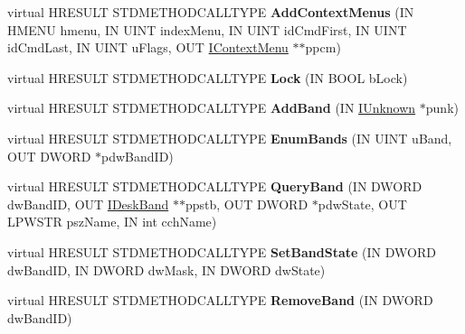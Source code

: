 \begin{DoxyCompactItemize}
\item 
\mbox{\label{class_c_tray_band_site_a7f420a73eb2031a704a1859064c8f207}} 
virtual H\+R\+E\+S\+U\+LT S\+T\+D\+M\+E\+T\+H\+O\+D\+C\+A\+L\+L\+T\+Y\+PE {\bfseries Add\+Context\+Menus} (IN H\+M\+E\+NU hmenu, IN U\+I\+NT index\+Menu, IN U\+I\+NT id\+Cmd\+First, IN U\+I\+NT id\+Cmd\+Last, IN U\+I\+NT u\+Flags, O\+UT \hyperlink{interface_i_context_menu}{I\+Context\+Menu} $\ast$$\ast$ppcm)
\item 
\mbox{\label{class_c_tray_band_site_abe04b4ec21254cceabe23005e13d9721}} 
virtual H\+R\+E\+S\+U\+LT S\+T\+D\+M\+E\+T\+H\+O\+D\+C\+A\+L\+L\+T\+Y\+PE {\bfseries Lock} (IN B\+O\+OL b\+Lock)
\item 
\mbox{\label{class_c_tray_band_site_aa7c040977ce02008a9393a336c75d371}} 
virtual H\+R\+E\+S\+U\+LT S\+T\+D\+M\+E\+T\+H\+O\+D\+C\+A\+L\+L\+T\+Y\+PE {\bfseries Add\+Band} (IN \hyperlink{interface_i_unknown}{I\+Unknown} $\ast$punk)
\item 
\mbox{\label{class_c_tray_band_site_a58b620ab69d9e54791b832413130e144}} 
virtual H\+R\+E\+S\+U\+LT S\+T\+D\+M\+E\+T\+H\+O\+D\+C\+A\+L\+L\+T\+Y\+PE {\bfseries Enum\+Bands} (IN U\+I\+NT u\+Band, O\+UT D\+W\+O\+RD $\ast$pdw\+Band\+ID)
\item 
\mbox{\label{class_c_tray_band_site_a602321533fd4bfede33e4b92eabce6a7}} 
virtual H\+R\+E\+S\+U\+LT S\+T\+D\+M\+E\+T\+H\+O\+D\+C\+A\+L\+L\+T\+Y\+PE {\bfseries Query\+Band} (IN D\+W\+O\+RD dw\+Band\+ID, O\+UT \hyperlink{interface_i_desk_band}{I\+Desk\+Band} $\ast$$\ast$ppstb, O\+UT D\+W\+O\+RD $\ast$pdw\+State, O\+UT L\+P\+W\+S\+TR psz\+Name, IN int cch\+Name)
\item 
\mbox{\label{class_c_tray_band_site_a691afaf066ef4e9b482df62d62edf058}} 
virtual H\+R\+E\+S\+U\+LT S\+T\+D\+M\+E\+T\+H\+O\+D\+C\+A\+L\+L\+T\+Y\+PE {\bfseries Set\+Band\+State} (IN D\+W\+O\+RD dw\+Band\+ID, IN D\+W\+O\+RD dw\+Mask, IN D\+W\+O\+RD dw\+State)
\item 
\mbox{\label{class_c_tray_band_site_a00f16c94f1d835943e67862da305ba1a}} 
virtual H\+R\+E\+S\+U\+LT S\+T\+D\+M\+E\+T\+H\+O\+D\+C\+A\+L\+L\+T\+Y\+PE {\bfseries Remove\+Band} (IN D\+W\+O\+RD dw\+Band\+ID)

\end{DoxyCompactItemize}

